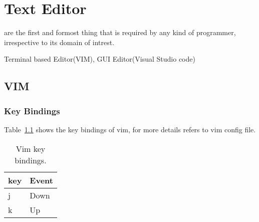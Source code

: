 \chapter{Text Editor}
\label{ch:text-editor}

 are the first and formost thing that is required by any kind of programmer, 
irrespective to its domain of intrest.

\newthought{} Terminal based Editor(VIM), GUI Editor(Visual Studio code)

\section{VIM}\label{sec:vim}
\subsection{Key Bindings}\label{sec:key-bindings}

Table~\ref{tab:normaltab} shows the key bindings of vim, for more details refers to vim config file.

\begin{table}[ht]
\centering
{}\selectfont
\begin{tabular}{ll}
\toprule
key & Event \\
\midrule
j & Down \\
k & Up \\
\bottomrule
\end{tabular}
\caption{Vim key bindings.}
\label{tab:normaltab}
\end{table}
